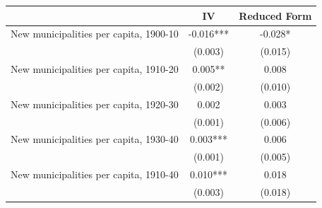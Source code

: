  \begin{tabular}{l*{2}{c}} \toprule
                &\multicolumn{1}{c}{IV}&\multicolumn{1}{c}{Reduced Form}\\
\midrule
New municipalities per capita, 1900-10&   -0.016***&   -0.028*  \\
                &  (0.003)   &  (0.015)   \\
\addlinespace
New municipalities per capita, 1910-20&    0.005** &    0.008   \\
                &  (0.002)   &  (0.010)   \\
\addlinespace
New municipalities per capita, 1920-30&    0.002   &    0.003   \\
                &  (0.001)   &  (0.006)   \\
\addlinespace
New municipalities per capita, 1930-40&    0.003***&    0.006   \\
                &  (0.001)   &  (0.005)   \\
\addlinespace
New municipalities per capita, 1910-40&    0.010***&    0.018   \\
                &  (0.003)   &  (0.018)   \\
       \bottomrule \end{tabular}
